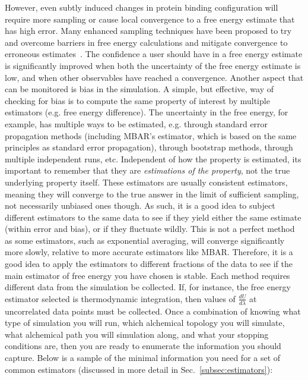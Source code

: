 \documentclass[9pt,bestpractices]{livecoms}
\begin{document}
However, even subtly induced changes in protein binding configuration will require more sampling or cause local convergence to a free energy estimate that has high error.
Many enhanced sampling techniques have been proposed to try and overcome barriers in free energy calculations and mitigate convergence to erroneous estimates~\cite{}. 
The confidence a user should have in a free energy estimate is significantly improved when both the uncertainty of the free energy estimate is low, and when other observables have reached a convergence.
%
Another aspect that can be monitored is bias in the simulation. A simple, but effective, way of checking for bias is to compute the same property of interest by multiple estimators (e.g. free energy difference). 
The uncertainty in the free energy, for example, has multiple ways to be estimated, e.g. through standard error propagation methods (including MBAR's estimator, which is based on the same principles as standard error propagation), through bootstrap methods, through multiple independent runs, etc. 
Independent of how the property is estimated, its important to remember that they are \textit{estimations of the property}, not the true underlying property itself. 
These estimators are usually consistent estimators, meaning they will converge to the true answer in the limit of sufficient sampling, not necessarily unbiased ones though.
As such, it is a good idea to subject different estimators to the same data to see if they yield either the same estimate (within error and bias), or if they fluctuate wildly. 
This is not a perfect method as some estimators, such as exponential averaging, will converge significantly more slowly, relative to more accurate estimators like MBAR. 
Therefore, it is a good idea to apply the estimators to different fractions of the data to see if the main estimator of free energy you have chosen is stable.
%
Each method requires different data from the simulation be collected.  If, for instance, the free energy estimator selected is thermodynamic integration, then values of $\frac{dU}{d\lambda}$ at uncorrelated data points must be collected. Once a combination of knowing what type of simulation you will run, which alchemical topology you will simulate, what alchemical path you will simulation along, and what your stopping conditions are, then you are ready to enumerate the information you should capture. Below is a sample of the minimal information you need for a set of common estimators (discussed in more detail in Sec.~\ref{subsec:estimators}):
%
\end{document}
